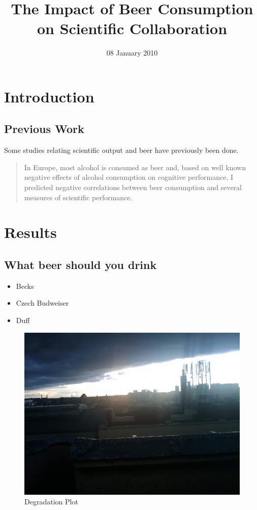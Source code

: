 \documentclass[pre,preprint, 11pt]{revtex4}
\title{The Impact of Beer Consumption on Scientific Collaboration}
\date{08 January 2010}
\begin{document}
\maketitle

\setcounter{tocdepth}{3}
\tableofcontents
\vspace*{1cm}
\section{Introduction}
\label{sec-1}

\subsection{Previous Work}
\label{sec-1.1}

Some studies relating scientific output and beer have previously been done.
\begin{quote}
In Europe, most alcohol is consumed as beer and, based on well known negative effects of alcohol consumption on cognitive performance, I predicted negative correlations between beer consumption and several measures of scientific performance.
\end{quote}

\section{Results}
\label{sec-2}

\subsection{What beer should you drink}
\label{sec-2.1}

\begin{itemize}
\item Becks
\item Czech Budweiser \cite{AnMa}
\item Duff
\end{itemize}
\begin{figure}[htb]
\centerline{\includegraphics[scale=0.75]{./darker.jpg}}
\caption{\label{fig:degradation}Degradation Plot}
\end{figure}


\end{document}
